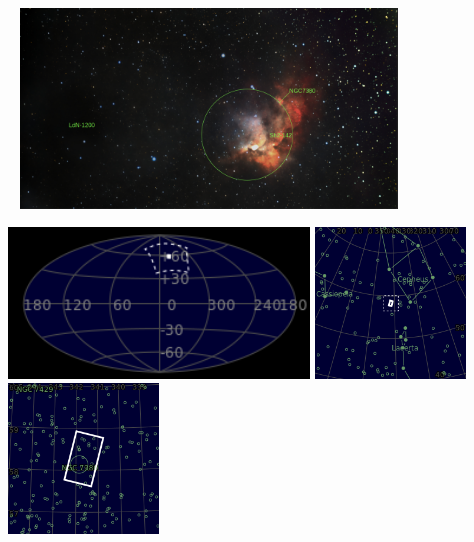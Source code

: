 \begin{center}
 \ \newpage
\includegraphics[width=0.75\textwidth]{../Imaging//Annotated/Wizard_Nebula_Annotated.jpg}

\includegraphics[height=4cm]{../Imaging//Annotated/Wizard_Nebula_Globe.jpg}
\includegraphics[height=4cm]{../Imaging//Annotated/Wizard_Nebula_Close.jpg}
\includegraphics[height=4cm]{../Imaging//Annotated/Wizard_Nebula_Closer.jpg}
\end{center}


